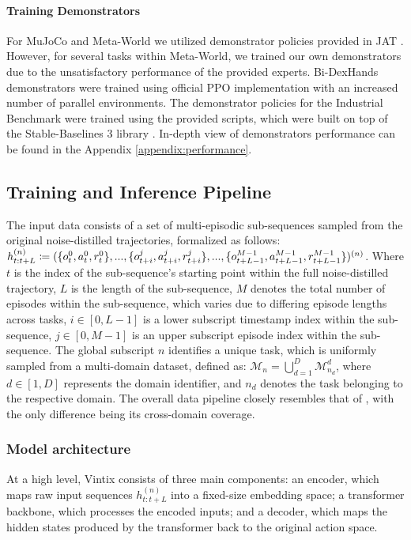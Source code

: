 \documentclass{article}
\theoremstyle{plain}
\theoremstyle{definition}
\theoremstyle{remark}
\begin{document}
\paragraph{Training Demonstrators} For MuJoCo and Meta-World we utilized demonstrator policies provided in JAT \cite{gallouédec2024jacktradesmastersome}. However, for several tasks within Meta-World, we trained our own demonstrators due to the unsatisfactory performance of the provided experts. Bi-DexHands demonstrators were trained using official PPO \cite{schulman2017proximalpolicyoptimizationalgorithms} implementation with an increased number of parallel environments. The demonstrator policies for the Industrial Benchmark were trained using the provided scripts, which were built on top of the Stable-Baselines 3 library \cite{stable-baselines3}. In-depth view of demonstrators performance can be found in the Appendix \ref{appendix:performance}.

\subsection{Training and Inference Pipeline}
The input data consists of a set of multi-episodic sub-sequences sampled from the original noise-distilled trajectories, formalized as follows: $ \\ h_{t:t+L}^{(n)} \coloneqq (\{o_{t}^{0}, a_{t}^{0}, r_{t}^{0}\},...,\{o_{t+i}^{j}, a_{t+i}^{j}, r_{t+i}^{j}\},... \\, \{o_{t+L-1}^{M-1}, a_{t+L-1}^{M-1}, r_{t+L-1}^{M-1}\})^{(n)}$. Where $t$ is the index of the sub-sequence's starting point within the full noise-distilled trajectory, $L$ is the length of the sub-sequence, $M$ denotes the total number of episodes within the sub-sequence, which varies due to differing episode lengths across tasks, $i \in [0, L-1]$ is a lower subscript timestamp index within the sub-sequence, $j \in [0, M-1]$ is an upper subscript episode index within the sub-sequence. The global subscript $n$ identifies a unique task, which is uniformly sampled from a multi-domain dataset, defined as: $\mathcal{M}_{n} = \bigcup_{d=1}^{D} \mathcal{M}_{n_d}^{d}$, where $d \in [1, D]$ represents the domain identifier, and 
$n_d$ denotes the task belonging to the respective domain. The overall data pipeline closely resembles that of \citet{laskin2022incontextreinforcementlearningalgorithm}, with the only difference being its cross-domain coverage. 

\subsubsection{Model architecture}
At a high level, Vintix consists of three main components: an encoder, which maps raw input sequences $h_{t:t+L}^{(n)}$ into a fixed-size embedding space; a transformer backbone, which processes the encoded inputs; and a decoder, which maps the hidden states produced by the transformer back to the original action space.
\end{document}

